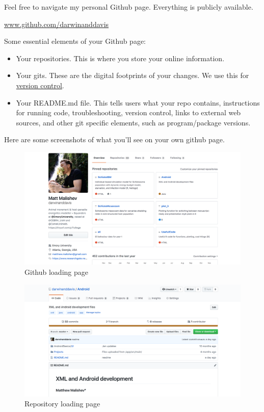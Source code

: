 \documentclass[10,portrait]{article}
\providecommand{\tightlist}{%
  \setlength{\itemsep}{0pt}\setlength{\parskip}{0pt}}
\begin{document}
Feel free to navigate my personal Github page. Everything is publicly
available.

\url{www.github.com/darwinanddavis}

Some essential elements of your Github page:

\begin{itemize}
\tightlist
\item
  Your repositories. This is where you store your online information.\\
  \hspace*{0.333em}
\item
  Your gits. These are the digital footprints of your changes. We use
  this for
  \href{https://git-scm.com/book/en/v2/Getting-Started-About-Version-Control}{version
  control}.\\
  \hspace*{0.333em}
\item
  Your README.md file. This tells users what your repo contains,
  instructions for running code, troubleshooting, version control, links
  to external web sources, and other git specific elements, such as
  program/package versions.\\
  \hspace*{0.333em}
\end{itemize}

\newpage  

Here are some screenshots of what you'll see on your own github page.

\begin{figure}
\centering
\includegraphics{loadingpage.png}
\caption{Github loading page}
\end{figure}

\begin{figure}
\centering
\includegraphics{repopage.png}
\caption{Repository loading page}
\end{figure}
\end{document}
